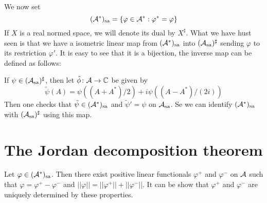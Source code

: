 \documentclass[10pt,english,a4paper]{article}
\theoremstyle{definition}
\def\Assa{\As_{\text{sa}}}
\def\sa{\text{sa}}
\def\vphi{\varphi}
\begin{document}
We now set 
\[  (\As^*)_{\text{sa}} = \{ \vphi \in \As^* : \vphi^* = \vphi \}\]
If $X$ is a real normed space, we will denote its dual by $X^{\sharp}$.
What we have hust seen is that we have a isometric linear map from 
$(\mathcal{A}^*)_{\text{sa}}$ into $(\Assa)^{\sharp}$ sending $\vphi$ to its restriction
$\vphi'$. It is easy to see that it is a bijection,
the inverse map can be defined as follows: 

If $\psi \in (\Assa)^{\sharp}$, then let $\tilde{\phi} \colon \mathcal{A} \to \mathbb{C}$ be 
given by 
\[ \tilde{\psi}(A) = \psi((A+A^*)/2) + i\psi((A-A^*)/(2i))  \]
Then one checks that $\tilde{\psi} \in (\mathcal{A}^*)_{\text{sa}}$ and
$\tilde{\psi}'=\psi$ on $\Assa$. Se we can identify 
$(\mathcal{A}^*)_{\text{sa}}$ with $(\Assa)^{\sharp}$ using this map. 

\section{The Jordan decomposition theorem}
Let $\vphi \in (\As^*)_{\sa}$. Then there exist 
positive linear functionals $\vphi^+$ and $\vphi^-$ on $\mathcal{A}$ such that 
$\vphi = \vphi^+ - \vphi^-$ and 
$||\vphi|| = ||\vphi^+|| + ||\vphi^-||$.
It can be show that $\vphi^+$ and $\vphi^-$ are uniquely determined by these
properties. 
\end{document}
